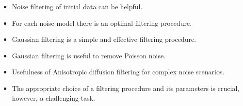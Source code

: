 \begin{itemize}	
	\item Noise filtering of initial data can be helpful. 
	    
	\item For each noise model there is an optimal filtering procedure.
	
	\item Gaussian filtering is a simple and effective filtering procedure. 
	
	\item Gaussian filtering is useful to remove Poisson noise.

	\item Usefulness of Anisotropic diffusion filtering for complex noise scenarios.
		
	\item The appropriate choice of a filtering procedure and its parameters is crucial, however, a challenging task. 
\end{itemize}
	
